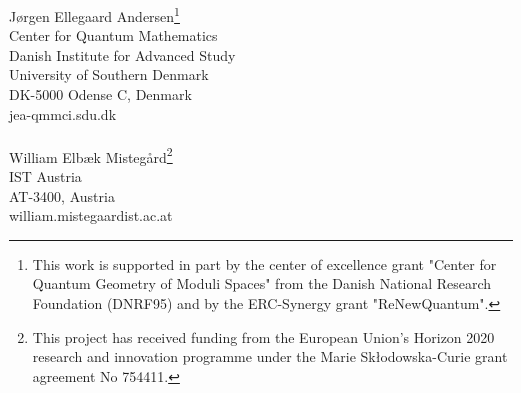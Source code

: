 \documentclass[a4paper]{article}
\theoremstyle{plain}
\begin{document}

 


 

\begin{appendices}




\end{appendices}
%





\noindent 
       Jørgen Ellegaard Andersen\footnote{This work is supported in part by the center of excellence grant "Center for Quantum Geometry of Moduli Spaces" from the Danish National Research Foundation (DNRF95) and by the ERC-Synergy grant "ReNewQuantum".} \\
      Center for Quantum Mathematics\\
      Danish Institute for Advanced Study\\
        University of Southern Denmark\\
        DK-5000 Odense C, Denmark\\
     jea-qm{\@@}mci.sdu.dk
     \\\\
     William Elbæk Mistegård\footnote{This project has received funding from the European Union’s Horizon 2020 research and innovation programme under the Marie Skłodowska-Curie grant agreement No 754411.}  \\
      IST Austria \\
        AT-3400, Austria \\
    william.mistegaard{\@@}ist.ac.at
\end{document}
